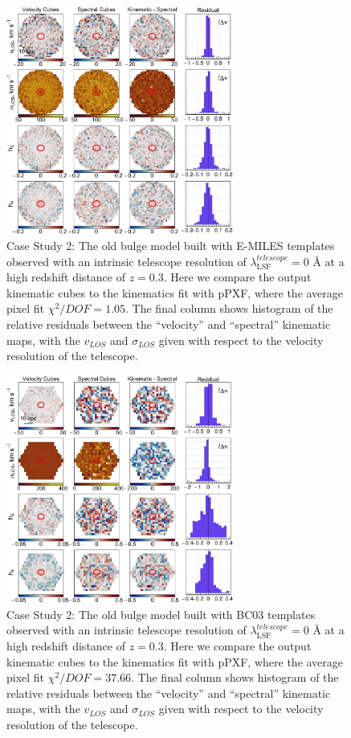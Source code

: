 \documentclass[
  journal=pasa,
  manuscript=research-paper, %
  year=2020,
  volume=37,
]{cup-journal}
\begin{document}
\begin{figure}
    \centering
    \includegraphics[keepaspectratio, width=7.5cm]{cs2_old_bulge_velocities_highz_EMILES.jpeg}
    \caption{Case Study 2: The old bulge model built with E-MILES templates observed with an intrinsic telescope resolution of  $\lambda_{\text{LSF}}^{telescope} = 0$ \AA{} at a high redshift distance of $z = 0.3$. Here we compare the output kinematic cubes to the kinematics fit with pPXF, where the average pixel fit $\chi^2/DOF = 1.05$. The final column shows histogram of the relative residuals between the ``velocity'' and ``spectral'' kinematic maps, with the $v_{LOS}$ and $\sigma_{LOS}$ given with respect to the velocity resolution of the telescope.}
    \label{fig:cs2_oldbulge_E-MILES}
\end{figure}

\begin{figure}
    \centering
    \includegraphics[keepaspectratio, width=7.5cm]{cs2_old_bulge_velocities_highz_BC03hr.jpeg}
    \caption{Case Study 2: The old bulge model built with BC03 templates observed with an intrinsic telescope resolution of  $\lambda_{\text{LSF}}^{telescope} = 0$ \AA{} at a high redshift distance of $z = 0.3$. Here we compare the output kinematic cubes to the kinematics fit with pPXF, where the average pixel fit $\chi^2/DOF = 37.66$. The final column shows histogram of the relative residuals between the ``velocity'' and ``spectral'' kinematic maps, with the $v_{LOS}$ and $\sigma_{LOS}$ given with respect to the velocity resolution of the telescope.}
    \label{fig:cs2_oldbulge_BC03}
\end{figure}
\end{document}
